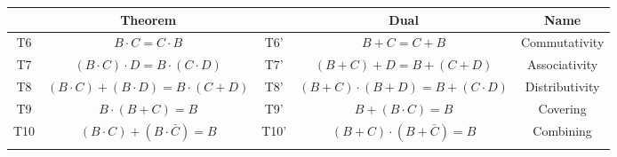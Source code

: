 \documentclass[12pt]{article}
\begin{document}
\begin{enumerate}
    \begin{table}[]
        \centering
        \begin{tabular}{| c | c | c | c | c |}
        \hline \rule{0em}{1.25em}
            & \textbf{Theorem}                                                                                                            &      & \textbf{Dual}                                                                                                                & \textbf{Name}                                                 \\ \hline \rule{0em}{1.25em}
        T6  & $B \cdot C = C \cdot B$                                                                                                     & T6'  & $B + C = C + B$                                                                                                              & Commutativity                                                 \\ \hline \rule{0em}{1.25em}
        T7  & $(B \cdot C) \cdot D = B \cdot (C \cdot D)$                                                                                 & T7'  & $(B + C) + D = B + (C + D)$                                                                                                  & Associativity                                                 \\ \hline \rule{0em}{1.25em}
        T8  & $(B \cdot C) + (B \cdot D) = B \cdot (C + D)$                                                                               & T8'  & $(B + C) \cdot (B + D) = B + (C \cdot D)$                                                                                    & Distributivity                                                \\ \hline \rule{0em}{1.25em}
        T9  & $B \cdot (B + C) = B$                                                                                                       & T9'  & $B + (B \cdot C) = B$                                                                                                        & Covering                                                      \\ \hline \rule{0em}{1.25em}
        T10 & $(B \cdot C) + (B \cdot \bar{C}) = B$                                                                                       & T10' & $(B + C) \cdot (B + \bar{C}) = B$                                                                                            & Combining                                                     \\ \hline \rule{0em}{1.25em}

\end{tabular}
\end{table}
\end{enumerate}
\end{document}
